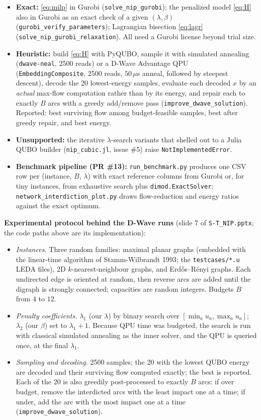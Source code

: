 \documentclass[11pt]{article}
\newcommand{\code}[1]{\texttt{#1}}
\begin{document}
\begin{itemize}[leftmargin=1.5em]
\item \textbf{Exact:} \eqref{eq:milp} in Gurobi (\code{solve\_nip\_gurobi}); the penalized model \eqref{eq:H} also in Gurobi as an exact check of a given $(\lambda,\beta)$ (\code{gurobi\_verify\_parameters}); Lagrangian bisection \eqref{eq:lagr} (\code{solve\_nip\_gurobi\_relaxation}). All need a Gurobi license beyond trial size.
\item \textbf{Heuristic:} build \eqref{eq:H} with PyQUBO, sample it with simulated annealing (\code{dwave-neal}, 2500 reads) or a D-Wave Advantage QPU (\code{EmbeddingComposite}, 2500 reads, $50\,\mu$s anneal, followed by steepest descent), decode the 20 lowest-energy samples, evaluate each decoded $x$ by an \emph{actual} max-flow computation rather than by its energy, and repair each to exactly $B$ arcs with a greedy add/remove pass (\code{improve\_dwave\_solution}). Reported: best surviving flow among budget-feasible samples, best after greedy repair, and best energy.
\item \textbf{Unsupported:} the iterative $\lambda$-search variants that shelled out to a Julia QUBO builder (\code{nip\_cubic.jl}, issue \#5) raise \code{NotImplementedError}.
\item \textbf{Benchmark pipeline (PR \#13):} \code{run\_benchmark.py} produces one CSV row per (instance, $B$, $\lambda$) with exact reference columns from Gurobi or, for tiny instances, from exhaustive search plus \code{dimod.ExactSolver}; \code{network\_interdiction\_plot.py} draws flow-reduction and energy ratios against the exact optimum.
\end{itemize}

\textbf{Experimental protocol behind the D-Wave runs} (slide 7 of \code{S-T\_NIP.pptx}; the code paths above are its implementation):
\begin{itemize}[leftmargin=1.5em]
\item \emph{Instances.} Three random families: maximal planar graphs (embedded with the linear-time algorithm of Stamm-Wilbrandt 1993; the \code{testcases/*.u} LEDA files), 2D $k$-nearest-neighbour graphs, and Erd\H{o}s--R\'enyi graphs. Each undirected edge is oriented at random, then reverse arcs are added until the digraph is strongly connected; capacities are random integers. Budgets $B$ from $4$ to $12$.
\item \emph{Penalty coefficients.} $\lambda_1$ (our $\lambda$) by binary search over $[\min_a u_a, \max_a u_a]$; $\lambda_2$ (our $\beta$) set to $\lambda_1 + 1$. Because QPU time was budgeted, the search is run with classical simulated annealing as the inner solver, and the QPU is queried once, at the final $\lambda_1$.
\item \emph{Sampling and decoding.} 2500 samples; the 20 with the lowest QUBO energy are decoded and their surviving flow computed exactly; the best is reported. Each of the 20 is also greedily post-processed to exactly $B$ arcs: if over budget, remove the interdicted arcs with the least impact one at a time; if under, add the arc with the most impact one at a time (\code{improve\_dwave\_solution}).
\end{itemize}
\end{document}
